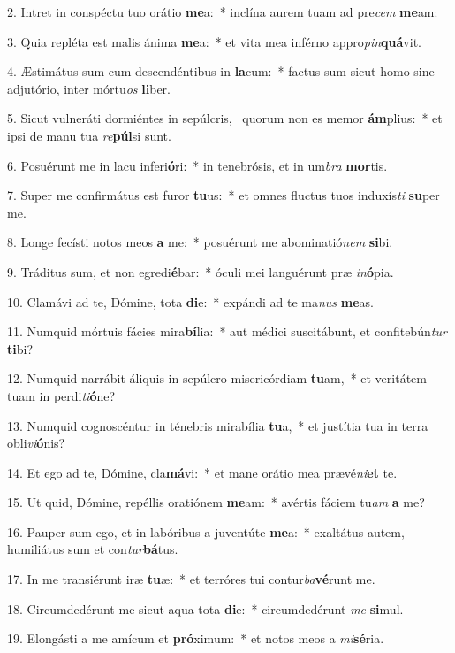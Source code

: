 2. Intret in conspéctu tuo orátio \textbf{me}a:~*  inclína aurem tuam ad pre\textit{cem} \textbf{me}am:\

3. Quia repléta est malis ánima \textbf{me}a:~*  et vita mea inférno appro\textit{pin}\textbf{quá}vit.\

4. Æstimátus sum cum descendéntibus in \textbf{la}cum:~*  factus sum sicut homo sine adjutório, inter mórtu\textit{os} \textbf{li}ber.\

5. Sicut vulneráti dormiéntes in sepúlcris, \dag\  quorum non es memor \textbf{ám}plius:~*  et ipsi de manu tua \textit{re}\textbf{púl}si sunt.\

6. Posuérunt me in lacu inferi\textbf{ó}ri:~*  in tenebrósis, et in um\textit{bra} \textbf{mor}tis.\

7. Super me confirmátus est furor \textbf{tu}us:~*  et omnes fluctus tuos induxís\textit{ti} \textbf{su}per me.\

8. Longe fecísti notos meos \textbf{a} me:~*  posuérunt me abominatió\textit{nem} \textbf{si}bi.\

9. Tráditus sum, et non egredi\textbf{é}bar:~*  óculi mei languérunt præ \textit{in}\textbf{ó}pia.\

10. Clamávi ad te, Dómine, tota \textbf{di}e:~*  expándi ad te ma\textit{nus} \textbf{me}as.\

11. Numquid mórtuis fácies mira\textbf{bí}lia:~*  aut médici suscitábunt, et confitebún\textit{tur} \textbf{ti}bi?\

12. Numquid narrábit áliquis in sepúlcro misericórdiam \textbf{tu}am,~*  et veritátem tuam in perdi\textit{ti}\textbf{ó}ne?\

13. Numquid cognoscéntur in ténebris mirabília \textbf{tu}a,~*  et justítia tua in terra obli\textit{vi}\textbf{ó}nis?\

14. Et ego ad te, Dómine, cla\textbf{má}vi:~*  et mane orátio mea prævé\textit{ni}\textbf{et} te.\

15. Ut quid, Dómine, repéllis oratiónem \textbf{me}am:~*  avértis fáciem tu\textit{am} \textbf{a} me?\

16. Pauper sum ego, et in labóribus a juventúte \textbf{me}a:~*  exaltátus autem, humiliátus sum et con\textit{tur}\textbf{bá}tus.\

17. In me transiérunt iræ \textbf{tu}æ:~*  et terróres tui contur\textit{ba}\textbf{vé}runt me.\

18. Circumdedérunt me sicut aqua tota \textbf{di}e:~*  circumdedérunt \textit{me} \textbf{si}mul.\

19. Elongásti a me amícum et \textbf{pró}ximum:~*  et notos meos a \textit{mi}\textbf{sé}ria.\

